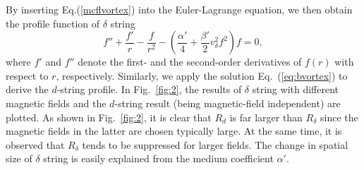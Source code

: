 \documentclass[12pt]{article}
\begin{document}
By inserting Eq.(\ref{mcflvortex}) into the Euler-Lagrange equation, we then obtain the profile
function of $\delta$ string
\begin{equation}
\label{eq:profilefunction}
 f'' + \frac{f'}{r} -\frac{f}{r^2} - (\frac{\alpha'}{4} + \frac{\beta'}{2} v_\delta^2 f^2)f=0,
\end{equation}
where $f'$ and $f''$ denote the first- and the second-order derivatives of $f(r)$ with respect to $r$,
respectively. Similarly, we apply the solution Eq.~(\ref{eq:bvortex}) to derive the $d$-string profile.
In Fig.~\ref{fig:2}, the results of $\delta$ string with different magnetic fields and the
$d$-string result (being magnetic-field independent) are plotted. 
As shown in Fig.~\ref{fig:2}, it is clear that $R_d$ is far larger than $R_\delta$ since
the magnetic fields in the latter are chosen typically large. At the same time, it is
observed that $R_\delta$ tends to be suppressed for larger fields.
The change in spatial size of $\delta$ string is easily explained from the medium coefficient $\alpha'$.
\end{document}
